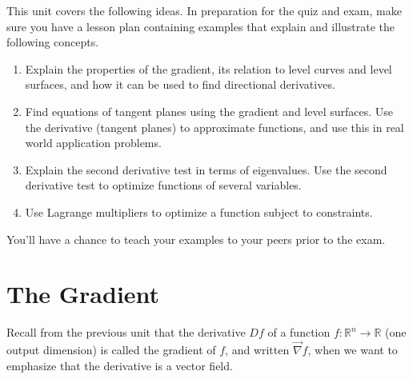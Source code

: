 
\noindent 
This unit covers the following ideas. In preparation for the quiz and exam, make sure you have a lesson plan containing examples that explain and illustrate the following concepts.  
\begin{enumerate}
\item Explain the properties of the gradient, its relation to level curves and level surfaces, and how it can be used to find directional derivatives.
\item Find equations of tangent planes using the gradient and level surfaces. Use the derivative (tangent planes) to approximate functions, and use this in real world application problems.
\item Explain the second derivative test in terms of eigenvalues. Use the second derivative test to optimize functions of several variables.
\item Use Lagrange multipliers to optimize a function subject to constraints. %
\end{enumerate}
You'll have a chance to teach your examples to your peers prior to the exam.



\section{The Gradient}

Recall from the previous unit that the derivative $Df$ of a function $f:\mathbb{R}^n\to\mathbb{R}$ (one output dimension) is called the gradient of $f$, and written $\vec \nabla f$, when we want to emphasize that the derivative is a vector field.  

